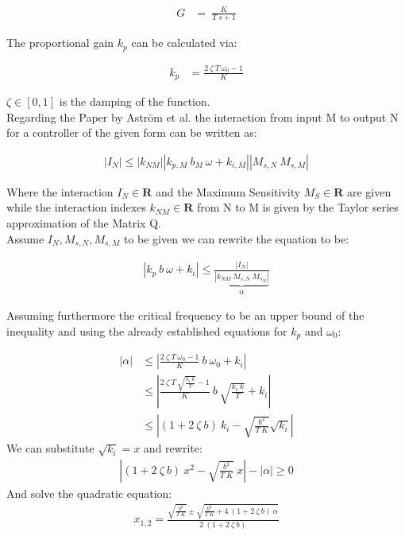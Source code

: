\documentclass[12pt]{article}
\begin{document}
\begin{align*}
G &= ~\frac{K}{T~s+1}
\end{align*}

The proportional gain $k_p$ can be calculated via:

\begin{align*}
k_p &= \frac{2~\zeta ~T ~\omega_0 -1}{K}
\end{align*}

$\zeta \in \left[ 0, 1 \right]$ is the damping of the function. \\

Regarding the Paper by Aström et al. the interaction from input M to output N for a controller of the given form can be written as:

\begin{align*}
|I_N| \leq |k_{NM}||k_{p,M} ~b_M~\omega+k_{i,M}| |M_{s,N}~M_{s,M}|
\end{align*}

Where the interaction $I_N \in \mathbf{R}$ and the Maximum Sensitivity $M_S \in \mathbf{R}$ are given while the interaction indexes $k_{NM} \in \mathbf{R}$ from N to M is given by the Taylor series approximation of the Matrix Q. \\

Assume $I_N, M_{s,N},M_{s,M}$ to be given we can rewrite the equation to be:

\begin{align*}
|k_p~b~\omega + k_i| \leq \underbrace{\frac{|I_N|}{|k_{NM}~M_{s,N}~M_{s_M} |} }_{ \alpha}
\end{align*}


Assuming furthermore the critical frequency to be an upper bound of the inequality and using the already established equations for $k_p$ and $\omega_0$:

\begin{align*}
|\alpha| &\leq | \frac{2~\zeta ~T ~\omega_0 -1}{K} ~b ~  \omega_0  + k_i| \\
& \leq | \frac{2~\zeta ~T ~\sqrt{ \frac{k_i ~k}{T} } -1}{K} ~b ~  \sqrt{ \frac{k_i ~k}{T} } + k_i| \\
& \leq |(1+2 ~\zeta ~b) ~k_i - \sqrt{\frac{b^2}{T~K}}\sqrt{k_i}|
\end{align*}
We can substitute $\sqrt{k_i} = x $ and rewrite:
\begin{align*}
|(1+2~\zeta~b)~x^2 - \sqrt{\frac{b^2}{T~K}} ~x | - |\alpha | \geq 0
\end{align*}
And solve the quadratic equation:
\begin{align*}
x_{1,2} = \frac{\sqrt{\frac{b^2}{T~K}} \pm \sqrt{\frac{b^2}{T~K} + 4 ~ (1+2~\zeta~b) ~\alpha}}{2 ~(1+2~\zeta~b)}
\end{align*}
 
\end{document}

